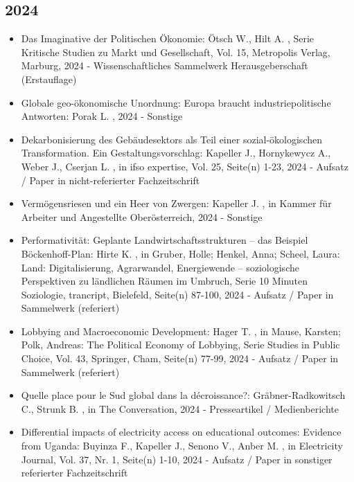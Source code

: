 \begin{itemize}
\end{itemize} 
 \subsection{2024} 
 \begin{itemize} 
	 \item Das Imaginative der Politischen Ökonomie: Ötsch W., Hilt A. , Serie Kritische Studien zu Markt und Gesellschaft, Vol. 15, Metropolis Verlag, Marburg, 2024 - Wissenschaftliches Sammelwerk Herausgeberschaft (Erstauflage)
	 \item Globale geo-ökonomische Unordnung: Europa braucht industriepolitische Antworten: Porak L. , 2024 - Sonstige
	 \item Dekarbonisierung des Gebäudesektors als Teil einer sozial-ökologischen Transformation. Ein Gestaltungsvorschlag: Kapeller J., Hornykewycz A., Weber J., Cserjan L. , in ifso expertise, Vol. 25, Seite(n) 1-23, 2024 - Aufsatz / Paper in nicht-referierter Fachzeitschrift
	 \item Vermögensriesen und ein Heer von Zwergen: Kapeller J. , in Kammer für Arbeiter und Angestellte Oberösterreich, 2024 - Sonstige
	 \item Performativität: Geplante Landwirtschaftsstrukturen – das Beispiel Böckenhoff-Plan: Hirte K. , in Gruber, Holle; Henkel, Anna; Scheel, Laura: Land: Digitalisierung, Agrarwandel, Energiewende – soziologische Perspektiven zu ländlichen Räumen im Umbruch, Serie 10 Minuten Soziologie, trancript, Bielefeld, Seite(n) 87-100, 2024 - Aufsatz / Paper in Sammelwerk (referiert)
	 \item Lobbying and Macroeconomic Development: Hager T. , in Mause, Karsten; Polk, Andreas: The Political Economy of Lobbying, Serie Studies in Public Choice, Vol. 43, Springer, Cham, Seite(n) 77-99, 2024 - Aufsatz / Paper in Sammelwerk (referiert)
	 \item Quelle place pour le Sud global dans la décroissance?: Gräbner-Radkowitsch C., Strunk B. , in The Conversation, 2024 - Presseartikel / Medienberichte
	 \item Differential impacts of electricity access on educational outcomes: Evidence from Uganda: Buyinza F., Kapeller J., Senono V., Anber M. , in Electricity Journal, Vol. 37, Nr. 1, Seite(n) 1-10, 2024 - Aufsatz / Paper in sonstiger referierter Fachzeitschrift
\end{itemize} 
